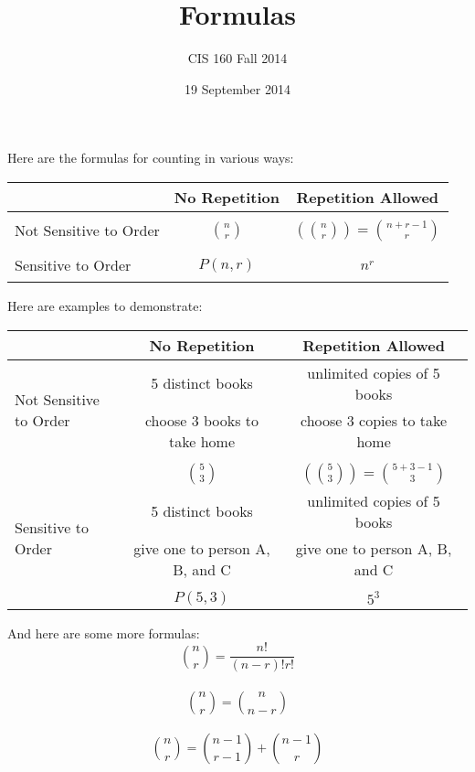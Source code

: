 \documentclass[11pt]{article}
\title{Formulas}
\author{CIS 160 Fall 2014}
\date{19 September 2014}
\begin{document}
\maketitle

\setlength{\parindent}{0pt}

Here are the formulas for counting in various ways:

\begin{center}
\begin{tabular}{ |l|c|c| }
\hline
 & No Repetition & Repetition Allowed \\ \hline
\multirow{3}{*}{Not Sensitive to Order}
 & & \\
 & $ \binom{n}{r} $ & $ \left(\!\!{n\choose r}\!\!\right) = \binom{n+r-1}{r} $ \\
  & & \\

 \hline
\multirow{3}{*}{Sensitive to Order}
 & & \\
 & $ P(n,r) $ & $ n^r $ \\
  & & \\
 \hline
\end{tabular}
\end{center}

Here are examples to demonstrate:

\begin{center}
\begin{tabular}{ |l|c|c| }
\hline
 & No Repetition & Repetition Allowed \\ \hline
\multirow{3}{*}{Not Sensitive to Order}
 & {5 distinct books} & {unlimited copies of 5 books} \\
 & {choose 3 books to take home} & {choose 3 copies to take home} \\
 & & \\
 & $ \binom{5}{3} $ & $ \left(\!\!{5\choose 3}\!\!\right) = \binom{5+3-1}{3} $ \\ 
 \hline
\multirow{3}{*}{Sensitive to Order}
 & {5 distinct books} & {unlimited copies of 5 books} \\
 & {give one to person A, B, and C} & {give one to person A, B, and C} \\
 & & \\
 & $ P(5,3) $ & $ 5^3 $ \\ 
 \hline
\end{tabular}
\end{center}

And here are some more formulas: \\
\[ \binom{n}{r} = \frac{n!}{(n-r)!r!} \] \\
\[ \binom{n}{r} = \binom{n}{n-r} \] \\
\[ \binom{n}{r} = \binom{n-1}{r-1} + \binom{n-1}{r} \]
\end{document}
